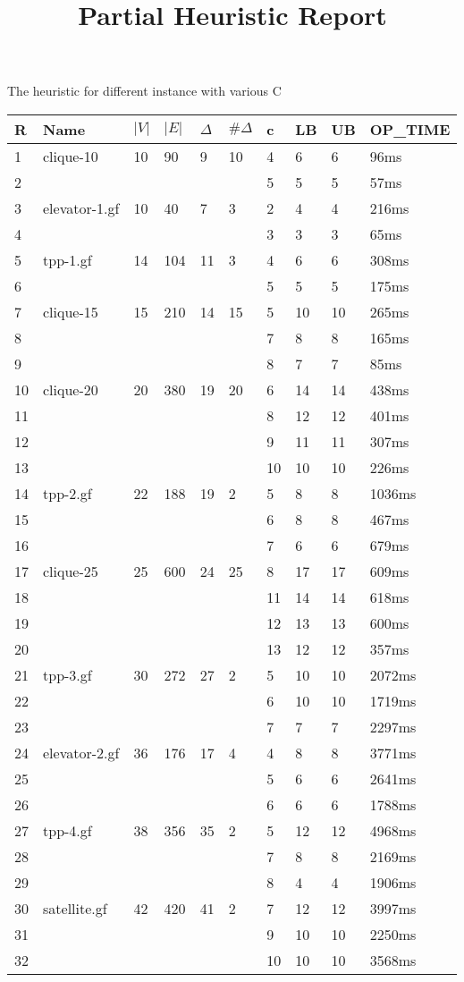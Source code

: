 \documentclass{article}
\title{Partial Heuristic Report}
\begin{document}
\maketitle
The heuristic for different instance with various C
\begin{longtable}{|l |l |l |l |l |l |l |l |l |l |}
\hline
R&Name&$|V|$&$|E|$&$\Delta$&$\# \Delta$&c&LB&UB&OP\_TIME\\
\hline
1&clique-10&10&90&9&10&4&6&6&96ms\\
2&&&&&&5&5&5&57ms\\
3&elevator-1.gf&10&40&7&3&2&4&4&216ms\\
4&&&&&&3&3&3&65ms\\
5&tpp-1.gf&14&104&11&3&4&6&6&308ms\\
6&&&&&&5&5&5&175ms\\
7&clique-15&15&210&14&15&5&10&10&265ms\\
8&&&&&&7&8&8&165ms\\
9&&&&&&8&7&7&85ms\\
10&clique-20&20&380&19&20&6&14&14&438ms\\
11&&&&&&8&12&12&401ms\\
12&&&&&&9&11&11&307ms\\
13&&&&&&10&10&10&226ms\\
14&tpp-2.gf&22&188&19&2&5&8&8&1036ms\\
15&&&&&&6&8&8&467ms\\
16&&&&&&7&6&6&679ms\\
17&clique-25&25&600&24&25&8&17&17&609ms\\
18&&&&&&11&14&14&618ms\\
19&&&&&&12&13&13&600ms\\
20&&&&&&13&12&12&357ms\\
21&tpp-3.gf&30&272&27&2&5&10&10&2072ms\\
22&&&&&&6&10&10&1719ms\\
23&&&&&&7&7&7&2297ms\\
24&elevator-2.gf&36&176&17&4&4&8&8&3771ms\\
25&&&&&&5&6&6&2641ms\\
26&&&&&&6&6&6&1788ms\\
27&tpp-4.gf&38&356&35&2&5&12&12&4968ms\\
28&&&&&&7&8&8&2169ms\\
29&&&&&&8&4&4&1906ms\\
30&satellite.gf&42&420&41&2&7&12&12&3997ms\\
31&&&&&&9&10&10&2250ms\\
32&&&&&&10&10&10&3568ms\\

\end{longtable}
\end{document}
